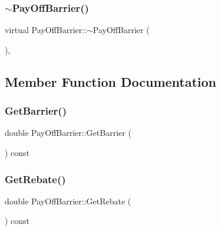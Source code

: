 \hypertarget{classPayOffBarrier_a16fa76cfd65461bc2eea467ccbdb23eb}{}\label{classPayOffBarrier_a16fa76cfd65461bc2eea467ccbdb23eb} 
\subsubsection{\texorpdfstring{$\sim$\+Pay\+Off\+Barrier()}{~PayOffBarrier()}}
{\footnotesize\ttfamily virtual Pay\+Off\+Barrier\+::$\sim$\+Pay\+Off\+Barrier (\begin{DoxyParamCaption}{ }\end{DoxyParamCaption})\hspace{0.3cm}{\ttfamily [inline]}, {\ttfamily [virtual]}}



\subsection{Member Function Documentation}
\hypertarget{classPayOffBarrier_a60eb2ac1bebf772f3acd9cb83ae8fe27}{}\label{classPayOffBarrier_a60eb2ac1bebf772f3acd9cb83ae8fe27} 
\subsubsection{\texorpdfstring{Get\+Barrier()}{GetBarrier()}}
{\footnotesize\ttfamily double Pay\+Off\+Barrier\+::\+Get\+Barrier (\begin{DoxyParamCaption}{ }\end{DoxyParamCaption}) const\hspace{0.3cm}{\ttfamily [inline]}}

\hypertarget{classPayOffBarrier_ab8e43255a688a822dc651f0b47000fdc}{}\label{classPayOffBarrier_ab8e43255a688a822dc651f0b47000fdc} 
\subsubsection{\texorpdfstring{Get\+Rebate()}{GetRebate()}}
{\footnotesize\ttfamily double Pay\+Off\+Barrier\+::\+Get\+Rebate (\begin{DoxyParamCaption}{ }\end{DoxyParamCaption}) const\hspace{0.3cm}{\ttfamily [inline]}}

